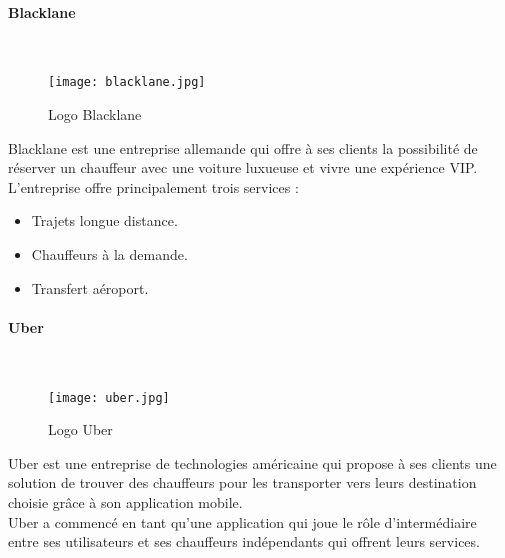 \paragraph{Blacklane}\mbox{} \\
\vspace{1cm}
\begin{figure}[H]
    \centering
    \texttt{[image: blacklane.jpg]}
    \vspace{0.5cm}
    \caption{Logo Blacklane}
    \label{fig:blacklane_logo}
\end{figure}
\vspace{1cm}
Blacklane est une entreprise allemande qui offre à ses clients la possibilité de réserver un chauffeur avec une voiture luxueuse et vivre une expérience VIP.\\
\noindent L'entreprise offre principalement trois services :
\begin{itemize}
    \item Trajets longue distance.
    \item Chauffeurs à la demande.
    \item Transfert aéroport.
\end{itemize}
\paragraph{Uber}\mbox{} \\
\vspace{1cm}
\begin{figure}[H]
    \centering
    \texttt{[image: uber.jpg]}
    \vspace{0.5cm}
    \caption{Logo Uber}
    \label{fig:uber_logo}
\end{figure}
\vspace{1cm}
Uber est une entreprise de technologies américaine qui propose à ses clients une solution de trouver des chauffeurs pour les transporter vers leurs destination choisie grâce à son application mobile.\\
\noindent Uber a commencé en tant qu'une application qui joue le rôle d'intermédiaire entre ses utilisateurs et ses chauffeurs indépendants qui offrent leurs services.
